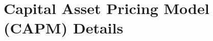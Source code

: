\documentclass{ledger}
\begin{document}





\newpage 	

\appendix
\setcounter{section}{0}
\section{Capital Asset Pricing Model (CAPM) Details}\label{appendix:capm_details}

\vspace{12pt}
\end{document}
